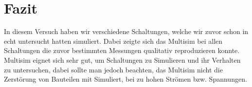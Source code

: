 \documentclass[12pt,a4paper]{article}
\begin{document}
\section{Fazit}

In diesem Versuch haben wir verschiedene Schaltungen, welche wir zuvor schon in echt untersucht hatten simuliert. Dabei zeigte sich das Multisim bei allen Schaltungen die zuvor bestimmten Messungen qualitativ reproduzieren konnte. Multisim eignet sich sehr gut, um Schaltungen zu Simulieren und ihr Verhalten zu untersuchen, dabei sollte man jedoch beachten, das Multisim nicht die Zerstörung von Bauteilen mit Simuliert, bei zu hohen Strömen bzw. Spannungen.
\end{document}
